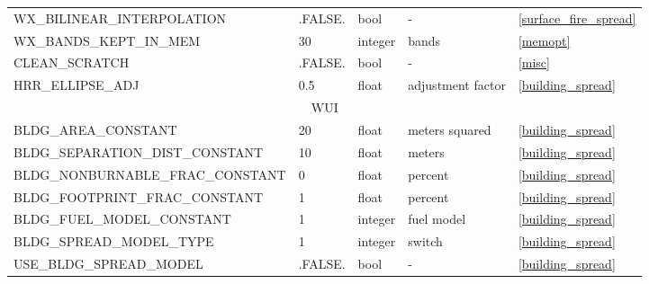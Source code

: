 \begin{landscape}
\begin{center}
\begin{longtable}{lllll}
WX\_BILINEAR\_INTERPOLATION                  & .FALSE.                    & bool                   & -                                  & \ref{surface_fire_spread}            \\
WX\_BANDS\_KEPT\_IN\_MEM                     & 30                         & integer                & bands                              & \ref{memopt}                         \\
CLEAN\_SCRATCH                               & .FALSE.                    & bool                   & -                                  & \ref{misc}                           \\
HRR\_ELLIPSE\_ADJ                            & 0.5                        & float                  & adjustment factor                  & \ref{building_spread}                \\
\multicolumn{5}{c}{WUI}                                                                                                                                                        \\
\toprule
BLDG\_AREA\_CONSTANT                         & 20                         & float                  & meters squared                     & \ref{building_spread}                \\
BLDG\_SEPARATION\_DIST\_CONSTANT             & 10                         & float                  & meters                             & \ref{building_spread}                \\
BLDG\_NONBURNABLE\_FRAC\_CONSTANT            & 0                          & float                  & percent                            & \ref{building_spread}                \\
BLDG\_FOOTPRINT\_FRAC\_CONSTANT              & 1                          & float                  & percent                            & \ref{building_spread}                \\
BLDG\_FUEL\_MODEL\_CONSTANT                  & 1                          & integer                & fuel model                         & \ref{building_spread}                \\
BLDG\_SPREAD\_MODEL\_TYPE                    & 1                          & integer                & switch                             & \ref{building_spread}                \\
USE\_BLDG\_SPREAD\_MODEL                     & .FALSE.                    & bool                   & -                                  & \ref{building_spread}                \\

\end{longtable}
\end{center}
\end{landscape}
